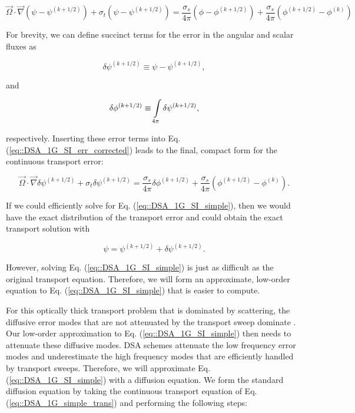 \begin{equation}
\label{eq::DSA_1G_SI_err_corrected}
\vec{\Omega} \cdot \vec{\nabla} \left( \psi - \psi^{(k+1/2)} \right) + \sigma_t \left( \psi -  \psi^{(k+1/2)}\right) =  \frac{ \sigma_s}{4 \pi} \left( \phi -  \phi^{(k+1/2)}\right) +  \frac{ \sigma_s}{4 \pi} \left( \phi^{(k+1/2)} -  \phi^{(k)}\right)  
\end{equation}

\noindent For brevity, we can define succinct terms for the error in the angular and scalar fluxes as

\begin{equation}
\label{eq::DSA_1G_psierr_term}
\delta \psi^{(k+1/2)} \equiv  \psi - \psi^{(k+1/2)}  ,
\end{equation}

\noindent and

\begin{equation}
\label{eq::DSA_1G_phierr_term}
 \delta \phi^{(k+1/2)} \equiv \int\displaylimits_{4 \pi} \delta \psi^{(k+1/2)} ,
\end{equation}

\noindent respectively. Inserting these error terms into Eq. (\ref{eq::DSA_1G_SI_err_corrected}) leads to the final, compact form for the continuous transport error:

\begin{equation}
\label{eq::DSA_1G_SI_simple}
\vec{\Omega} \cdot \vec{\nabla} \delta \psi^{(k+1/2)} + \sigma_t \delta \psi^{(k+1/2)} =   \frac{ \sigma_s}{4 \pi} \delta \phi^{(k+1/2)}+  \frac{ \sigma_s}{4 \pi} \left( \phi^{(k+1/2)} -  \phi^{(k)}\right)   .
\end{equation}

\noindent If we could efficiently solve for Eq. (\ref{eq::DSA_1G_SI_simple}), then we would have the exact distribution of the transport error and could obtain the exact transport solution with 

\begin{equation}
\label{eq::DSA_1G_exact_update}
\psi = \psi^{(k+1/2)} + \delta \psi^{(k+1/2)} .
\end{equation}

\noindent However, solving Eq. (\ref{eq::DSA_1G_SI_simple}) is just as difficult as the original transport equation. Therefore, we will form an approximate, low-order equation to Eq. (\ref{eq::DSA_1G_SI_simple}) that is easier to compute.

For this optically thick transport problem that is dominated by scattering, the diffusive error modes that are not attenuated by the transport sweep dominate \cite{ref::adams_larsen_iter_methods}. Our low-order approximation to Eq. (\ref{eq::DSA_1G_SI_simple}) then needs to attenuate these diffusive modes. DSA schemes attenuate the low frequency error modes and underestimate the high frequency modes that are efficiently handled by transport sweeps. Therefore, we will approximate Eq. (\ref{eq::DSA_1G_SI_simple}) with a diffusion equation. We form the standard diffusion equation by taking the continuous transport equation of Eq. (\ref{eq::DSA_1G_simple_trans}) and performing the following steps:

